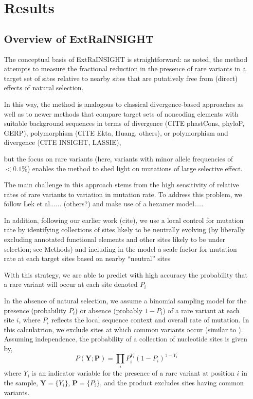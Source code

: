 \documentclass[11pt]{article}
\newcommand{\mathbb}[1]{\boldsymbol{\mathbf{#1}}}
\begin{document}
\section*{Results}

\subsection*{Overview of ExtRaINSIGHT}

The conceptual basis of ExtRaINSIGHT is straightforward: as noted, the method attempts to measure the fractional reduction in the presence of rare variants in a target set of sites relative to nearby sites that are putatively free from (direct) effects of natural selection.  

In this way, the method is analogous to classical divergence-based approaches \cite{X}
as well as to newer methods that compare target sets of noncoding elements with suitable background sequences in terms of divergence (CITE phastCons, phyloP, GERP), polymorphism (CITE Ekta, Huang, others), or polymorphism and divergence (CITE INSIGHT, LASSIE),

but the focus on rare variants (here, variants with minor allele frequencies of $< 0.1$\%) enables the method to shed light on mutations of large selective effect.

The main challenge in this approach stems from the high sensitivity of relative rates of rare variants to variation in mutation rate.  To address this problem, we follow Lek et al...... (others?)
and make use of a 
hexamer model.....

In addition, following our earlier work (cite), we use a local control for mutation rate
by identifying collections of sites likely to be neutrally evolving (by liberally excluding annotated functional elements and other sites likely to be under selection; see Methods)
and including in the model a scale factor for mutation rate at each target sites based on nearby ``neutral'' sites

With this strategy,
we are able to predict with high accuracy the probability that a rare variant will occur at each site
denoted $P_i$


In the absence of natural selection, we assume a  binomial sampling model for the presence (probability $P_i$) or absence (probably $1-P_i$) of a rare variant at each site $i$, where $P_i$ reflects the local sequence context and overall rate of mutation.  In this calculatrion, we exclude sites at which common variants occur (similar to \cite{SAMOETAL14,LEKETAL16}).
Assuming independence, the probability of a collection of nucleotide sites is given by,
\begin{equation}
P(\mathbb{Y}; \mathbb{P}) = \prod_i P_i^{Y_i}(1-P_i)^{1-Y_i}
\end{equation}
\noindent where $Y_i$ is an indicator variable for the presence of a rare variant at position $i$ in the sample, $\mathbb{Y} = \{Y_i\}$, $\mathbb{P} = \{P_i\}$,  and the product excludes sites having common variants.
\end{document}
